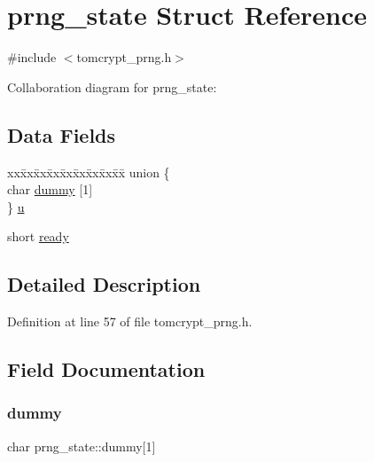 \hypertarget{structprng__state}{}\section{prng\+\_\+state Struct Reference}
\label{structprng__state}


{\ttfamily \#include $<$tomcrypt\+\_\+prng.\+h$>$}



Collaboration diagram for prng\+\_\+state\+:
\subsection*{Data Fields}
\begin{DoxyCompactItemize}
\item 
\begin{tabbing}
xx\=xx\=xx\=xx\=xx\=xx\=xx\=xx\=xx\=\kill
union \{\\
\>char \mbox{\hyperlink{structprng__state_a6f8aa3e9b51354296e0090d01dcc703b}{dummy}} \mbox{[}1\mbox{]}\\
\} \mbox{\hyperlink{structprng__state_a73ffeba26752871bc883f035a89f0991}{u}}\\

\end{tabbing}\item 
short \mbox{\hyperlink{structprng__state_ad5b2704260668ba49701ba0169286837}{ready}}
\end{DoxyCompactItemize}


\subsection{Detailed Description}


Definition at line 57 of file tomcrypt\+\_\+prng.\+h.



\subsection{Field Documentation}
\mbox{\label{structprng__state_a6f8aa3e9b51354296e0090d01dcc703b}} 
\subsubsection{\texorpdfstring{dummy}{dummy}}
{\footnotesize\ttfamily char prng\+\_\+state\+::dummy\mbox{[}1\mbox{]}}



